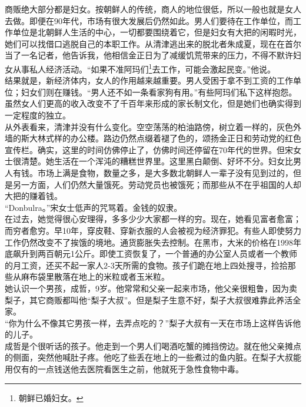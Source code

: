 \begin{multicols}{\theparacolNo}
商贩绝大部分都是妇女。按朝鲜人的传统，商人的地位很低，所以一般也就是女人去做。即便在90年代，市场有很大发展后仍然如此。男人们要待在工作单位，而工作单位是北朝鲜人生活的中心，一切都要围绕着它，但是妇女有大把的闲暇时光，她们可以找借口逃脱自己的本职工作。从清津逃出来的脱北者朱成夏，现在在首尔当了一名记者，他告诉我，他相信金正日为了减缓饥荒带来的压力，不得不默许妇女从事私人经济活动。“如果不准阿玛们\footnote{朝鲜已婚妇女。}去工作，可能会激起民变。”他说。\\

结果就是，新经济体内，女人的作用越来越重要。男人受困于拿不到工资的工作单位；妇女们则在赚钱。“男人还不如一条看家狗有用。”有些阿玛们私下这样抱怨。虽然女人们更高的收入改变不了千百年来形成的家长制文化，但是她们也确实得到一定程度的独立。\\

从外表看来，清津并没有什么变化。空空荡荡的柏油路傍，树立着一样的，灰色外墙的斯大林式样的办公楼。路边仍然点缀着褪了色的，颂扬金正日和劳动党的红色宣传栏。确实，这里的时间仿佛停止了，仿佛时间还停留在70年代的世界。但宋女士很清楚。她生活在一个浑沌的糟糕世界里。这里黑白颠倒、好坏不分。妇女比男人有钱。市场上满是食物，数量之多，是大多数北朝鲜人一辈子没有见到过的，但是另一方面，人们仍然大量饿死。劳动党员也被饿死；而那些从不在乎祖国的人却大把的赚着钱。\\

“Donbulra。”宋女士低声的咒骂着。金钱的奴隶。\\

在过去，她觉得很心安理得，多多少少大家都一样的穷。现在，她看见富者愈富；而穷者愈穷。早10年，穿皮鞋、穿新衣服的人会被视为经济罪犯。有些人即使努力工作仍然改变不了挨饿的境地。通货膨胀失去控制。在黑市，大米的价格在1998年底飙升到两百朝元1公斤。即使工资恢复了，一个普通的办公室人员或者一个教师的月工资，还买不起一家人2-3天所需的食物。孩子们跪在地上四处搜寻，捡拾那些从麻布袋里散落在地上的米粒或者玉米粒。\\

她认识一个男孩，成哲，9岁。他常常和父亲一起来市场，他父亲很粗鲁，因为卖梨子，其它商贩都叫他“梨子大叔”。但是梨子生意不好，梨子大叔很难靠此养活全家。\\

“你为什么不像其它男孩一样，去弄点吃的？”梨子大叔有一天在市场上这样告诉他的儿子。\\

成哲是个很听话的孩子。他走到一个男人们喝酒吃蟹的摊挡傍边。就在他父亲摊点的侧面，突然他喊肚子疼。他吃了些丢在地上的一些煮过的鱼内脏。在梨子大叔能用仅有的一点钱送他去医院看医生之前，他就死于急性食物中毒。\\


\end{multicols}

